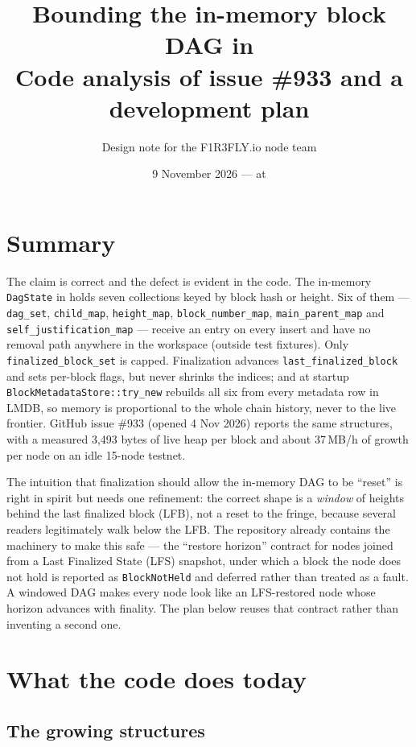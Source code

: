 \documentclass[11pt]{article}
\title{Bounding the in-memory block DAG in \code{f1r3node-rust}\\
\large Code analysis of issue \#933 and a development plan}
\author{Design note for the F1R3FLY.io node team}
\date{9 November 2026 --- \code{dev} at \code{0ccc315d}}
\newcommand{\code}[1]{\texttt{#1}}
\begin{document}
\maketitle

\section{Summary}

The claim is correct and the defect is evident in the code. The in-memory
\code{DagState} in 
holds seven collections keyed by block hash or height. Six of them ---
\code{dag\_set}, \code{child\_map}, \code{height\_map}, \code{block\_number\_map},
\code{main\_parent\_map} and \code{self\_justification\_map} --- receive an entry on
every insert and have no removal path anywhere in the workspace (outside test
fixtures). Only \code{finalized\_block\_set} is capped. Finalization advances
\code{last\_finalized\_block} and sets per-block flags, but never shrinks the
indices; and at startup \code{BlockMetadataStore::try\_new} rebuilds all six from
every metadata row in LMDB, so memory is proportional to the whole chain
history, never to the live frontier. GitHub issue \#933 (opened 4 Nov 2026)
reports the same structures, with a measured 3{,}493 bytes of live heap per
block and about 37\,MB/h of growth per node on an idle 15-node testnet.

The intuition that finalization should allow the in-memory DAG to be
``reset'' is right in spirit but needs one refinement: the correct shape is a
\emph{window} of heights behind the last finalized block (LFB), not a reset to
the fringe, because several readers legitimately walk below the LFB. The
repository already contains the machinery to make this safe --- the ``restore
horizon'' contract for nodes joined from a Last Finalized State (LFS) snapshot,
under which a block the node does not hold is reported as \code{BlockNotHeld}
and deferred rather than treated as a fault. A windowed DAG makes every node
look like an LFS-restored node whose horizon advances with finality. The plan
below reuses that contract rather than inventing a second one.

\section{What the code does today}

\subsection{The growing structures}
\end{document}
